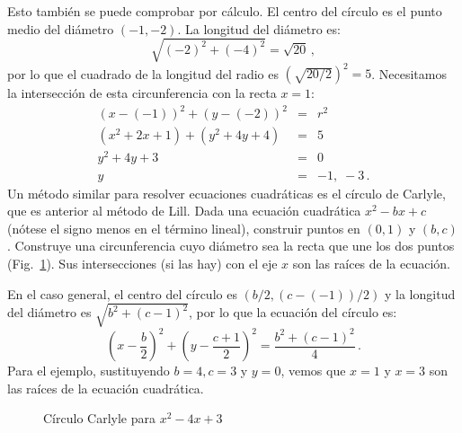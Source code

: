 Esto también se puede comprobar por cálculo. El centro del círculo es el punto medio del diámetro $(-1,-2)$. La longitud del diámetro es:
\[
\sqrt{(-2)^2+(-4)^2}=\sqrt{20}\,,
\]
por lo que el cuadrado de la longitud del radio es $\left(\sqrt{20/2}\right)^2=5$. Necesitamos la intersección de esta circunferencia con la recta $x=1$:
\begin{eqnarray*}
(x-(-1))^2+(y-(-2))^2&=&r^2\\
(x^2+2x+1)+(y^2+4y+4)&=&5\\
y^2+4y+3&=&0\\
y&=&-1,\;-3\,.
\end{eqnarray*}
Un método similar para resolver ecuaciones cuadráticas es el círculo de Carlyle, que es anterior al método de Lill. Dada una ecuación cuadrática $x^2-bx+c$ (nótese el signo menos en el término lineal), construir puntos en $(0,1)$ y $(b,c)$. Construye una circunferencia cuyo diámetro sea la recta que une los dos puntos (Fig.~\ref{f.carlyle-circle}). Sus intersecciones (si las hay) con el eje $x$ son las raíces de la ecuación.

En el caso general, el centro del círculo es $(b/2,(c-(-1))/2)$ y la longitud del diámetro es $\sqrt{b^2+(c-1)^2}$, por lo que la ecuación del círculo es:
\[
\left(x-\frac{b}{2}\right)^2+\left(y-\frac{c+1}{2}\right)^2=
\frac{b^2+(c-1)^2}{4}\,.
\]
Para el ejemplo, sustituyendo $b=4,c=3$ y $y=0$, vemos que $x=1$ y $x=3$ son las raíces de la ecuación cuadrática.

\begin{figure}[t]
\begin{center}
\end{center}
\caption{Círculo Carlyle para $x^2-4x+3$}\label{f.carlyle-circle}
\end{figure}


